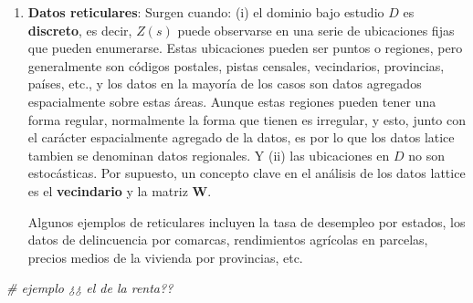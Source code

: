 \documentclass[
]{book}
\newenvironment{Shaded}{\begin{snugshade}}{\end{snugshade}}
\newcommand{\CommentTok}[1]{\textcolor[rgb]{0.56,0.35,0.01}{\textit{#1}}}
\begin{document}
\begin{enumerate}
\def\labelenumi{\arabic{enumi}.}
\setcounter{enumi}{1}
\item
  \textbf{Datos reticulares}: Surgen cuando: (i) el dominio bajo estudio \(D\) es
  \textbf{discreto}, es decir, \(Z(s)\) puede observarse en una serie de ubicaciones
  fijas que pueden enumerarse. Estas ubicaciones pueden ser puntos o regiones,
  pero generalmente son códigos postales, pistas censales, vecindarios,
  provincias, países, etc., y los datos en la mayoría de los casos son datos
  agregados espacialmente sobre estas áreas. Aunque estas regiones pueden
  tener una forma regular, normalmente la forma que tienen es irregular, y
  esto, junto con el carácter espacialmente agregado de la datos, es por lo
  que los datos latice tambien se denominan datos regionales. Y (ii) las
  ubicaciones en \(D\) no son estocásticas. Por supuesto, un concepto clave en
  el análisis de los datos lattice es el \textbf{vecindario} y la matriz \textbf{W}.

  Algunos ejemplos de reticulares incluyen la tasa de desempleo por estados,
  los datos de delincuencia por comarcas, rendimientos agrícolas en parcelas,
  precios medios de la vivienda por provincias, etc.
\end{enumerate}

\begin{Shaded}
\begin{Highlighting}[]
\CommentTok{\# ejemplo ¿¿ el de la renta??}
\end{Highlighting}
\end{Shaded}
\end{document}
